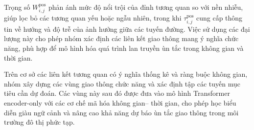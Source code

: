 Trọng số $W^{\text{pos}}_{i,j}$ phản ánh mức độ nổi trội của đỉnh tương quan so với nền nhiễu,
giúp lọc bỏ các tương quan yếu hoặc ngẫu nhiên, trong khi $\tau^{\text{pos}}_{i,j}$ cung cấp thông
tin về hướng và độ trễ của ảnh hưởng giữa các tuyến đường. Việc sử dụng các đại lượng này cho
phép nhóm xác định các liên kết giao thông mang ý nghĩa chức năng, phù hợp để mô hình hóa
quá trình lan truyền ùn tắc trong không gian và thời gian.

Trên cơ sở các liên kết tương quan có ý nghĩa thống kê và ràng buộc không gian, nhóm xây
dựng các vùng giao thông chức năng và xác định tập các tuyến mục tiêu cần dự đoán. Các vùng
này sau đó được đưa vào mô hình Transformer encoder-only với các cơ chế mã hóa không gian--
thời gian, cho phép học biểu diễn giàu ngữ cảnh và nâng cao khả năng dự báo ùn tắc giao thông
trong môi trường đô thị phức tạp.
